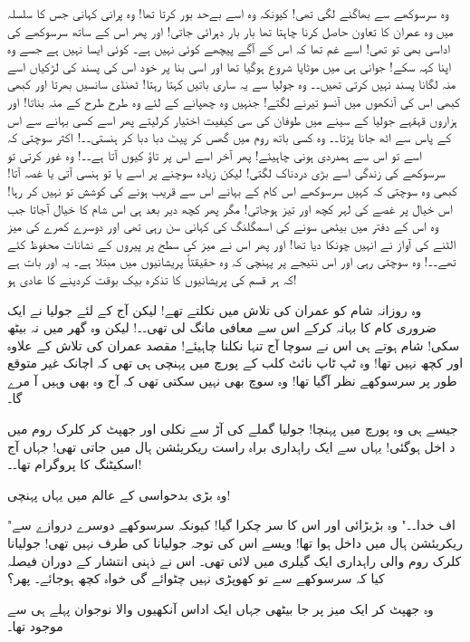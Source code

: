 وہ سرسوکھے سے بھاگنے لگی تھی! کیونکہ وہ اسے بےحد بور کرتا تھا! وہ پرانی کہانی جس کا سلسلہ میں وہ عمران کا تعاون حاصل کرنا چاہتا تھا بار بار دہرائی جاتی! اور پھر اس کے ساتھ سرسوکھے کی اداسی بھی تو تھی! اسے غم تھا کہ اس کے آگے پیچھے کوئی نہیں ہے۔ کوئی ایسا نہیں ہے جسے وہ اپنا کہہ سکے! جوانی ہی میں موٹاپا شروع ہوگیا تھا اور اسی بنا پر خود اس کی پسند کی لڑکیاں اسے منہ لگانا پسند نہیں کرتی تھیں۔۔ وہ جولیا سے یہ ساری باتیں کہتا رہتا! ٹھنڈی سانسیں بھرتا اور کبھی کبھی اس کی آنکھوں میں آنسو تیرنے لگتے! جنہیں وہ چھپانے کے لئے وہ طرح طرح کے منہ بناتا! اور ہزاروں قہقہے جولیا کے سینے میں طوفان کی سی کیفیت اختیار کرلیتے پھر اسے کسی بہانے سے اس کے پاس سے اٹھ جانا پڑتا۔۔ وہ کسی باتھ روم میں گھس کر پیٹ دبا دبا کر ہنستی۔۔! اکثر سوچتی کہ اسے تو اس سے ہمدردی ہونی چاہیئے! پھر آخر اسے اس پر تاؤ کیوں آتا ہے۔۔! وہ غور کرتی تو سرسوکھے کی زندگی اسے بڑی دردناک لگتی! لیکن زیادہ سوچنے پر اسے یا تو ہنسی آتی یا غصہ آتا! کبھی وہ سوچتی کہ کہیں سرسوکھے اس کام کے بہانے اس سے قریب ہونے کی کوشش تو نہیں کر رہا! اس خیال پر غصے کی لہر کچھ اور تیز ہوجاتی! مگر پھر کچھ دیر بعد ہی اس شام کا خیال آجاتا جب وہ اس کے دفتر میں بیٹھی سونے کی اسمگلنگ کی کہانی سن رہی تھی اور دوسرے کمرے کی میز الٹنے کی آواز نے انہیں چونکا دیا تھا! اور پھر اس نے میز کی سطح پر پیروں کے نشانات محفوظ کئے تھے۔۔! وہ سوچتی رہی اور اس نتیجے پر پہنچی کہ وہ حقیقتاً پریشانیوں میں مبتلا ہے۔ یہ اور بات ہے کہ ہر قسم کی پریشانیوں کا تذکرہ بیک بوقت کردینے کا عادی ہو!

وہ روزانہ شام کو عمران کی تلاش میں نکلتے تھے! لیکن آج کے لئے جولیا نے ایک ضروری کام کا بہانہ کرکے اس سے معافی مانگ لی تھی۔۔! لیکن وہ گھر میں نہ بیٹھ سکی! شام ہوتے ہی اس نے سوچا آج تنہا نکلنا چاہیئے! مقصد عمران کی تلاش کے علاوہ اور کچھ نہیں تھا! وہ ٹپ ٹاپ نائٹ کلب کے پورچ میں پہنچی ہی تھی کہ اچانک غیر متوقع طور پر سرسوکھے نظر آگیا تھا! وہ سوچ بھی نہیں سکتی تھی کہ آج وہ بھی وہیں آ مرے گا۔

جیسے ہی وہ پورچ میں پہنچا! جولیا گملے کی آڑ سے نکلی اور جھپٹ کر کلرک روم میں د اخل ہوگئی! یہاں سے ایک راہداری براہ راست ریکریئشن ہال میں جاتی تھی! جہاں آج اسکیٹنگ کا پروگرام تھا۔۔!

وہ بڑی بدحواسی کے عالم میں یہاں پہنچی!

"اف خدا۔۔" وہ بڑبڑائی اور اس کا سر چکرا گیا! کیونکہ سرسوکھے دوسرے دروازے سے ریکریئشن ہال میں داخل ہوا تھا! ویسے اس کی توجہ جولیانا کی طرف نہیں تھی! جولیانا کلرک روم والی راہداری ایک گیلری میں لائی تھی۔ اس نے ذہنی انتشار کے دوران فیصلہ کیا کہ سرسوکھے سے تو کھوپڑی نہیں چٹوائے گی خواہ کچھ ہوجائے۔ پھر؟

وہ جھپٹ کر ایک میز پر جا بیٹھی جہاں ایک اداس آنکھیوں والا نوجوان پہلے ہی سے موجود تھا۔

